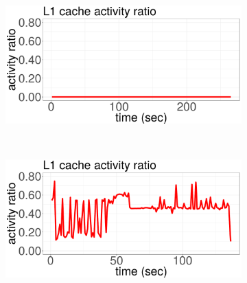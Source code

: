 \begin{figure}[!ht]
\begin{subfigure}[b]{.45\textwidth}
  \end{subfigure}%
\vspace{0.1cm}
	\begin{subfigure}[b]{.45\textwidth}
  	\includegraphics[width=\textwidth]{power_aware_job_scheduling/figures/activity_ratios/blackscholes_L1}
  \end{subfigure}%
~
	\begin{subfigure}[b]{.45\textwidth}
  	\includegraphics[width=\textwidth]{power_aware_job_scheduling/figures/activity_ratios/bodytrack_MEM}
  \end{subfigure}%


\end{figure}
